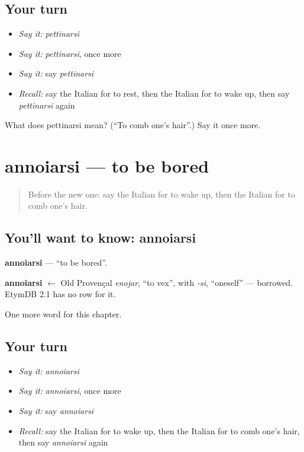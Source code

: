 \subsection*{Your turn}
\begin{itemize}
\raggedright
  \item \emph{Say it:} \emph{pettinarsi}
  \item \emph{Say it:} \emph{pettinarsi}, once more
  \item \emph{Say it:} say \emph{pettinarsi}
  \item \emph{Recall:} say the Italian for to rest, then the Italian for to wake up, then say \emph{pettinarsi} again
\end{itemize}

\begin{tcolorbox}[breakable,colback=teal!4,colframe=teal!35!black,title={Before you move on}]
What does pettinarsi mean? (\textquotedblleft{}To comb one's hair\textquotedblright{}.) Say it once more.
\end{tcolorbox}
\section[annoiarsi]{annoiarsi — to be bored}

\label{lesson:IT-C236-annoiarsi}



\begin{quote}
Before the new one: say the Italian for to wake up, then the Italian for to comb one's hair.
\end{quote}

\subsection*{You'll want to know: annoiarsi}
\textbf{annoiarsi} — \textquotedblleft{}to be bored\textquotedblright{}.

\begin{cousinweb}
\textbf{annoiarsi} $\leftarrow$ Old Provençal \emph{enojar}, \textquotedblleft{}to vex\textquotedblright{}, with \emph{-si}, \textquotedblleft{}oneself\textquotedblright{} — borrowed. EtymDB 2.1 has no row for it.
\end{cousinweb}

\begin{grammarlens}[title={What you've built}]
One more word for this chapter.
\end{grammarlens}

\subsection*{Your turn}
\begin{itemize}
\raggedright
  \item \emph{Say it:} \emph{annoiarsi}
  \item \emph{Say it:} \emph{annoiarsi}, once more
  \item \emph{Say it:} say \emph{annoiarsi}
  \item \emph{Recall:} say the Italian for to wake up, then the Italian for to comb one's hair, then say \emph{annoiarsi} again
\end{itemize}

